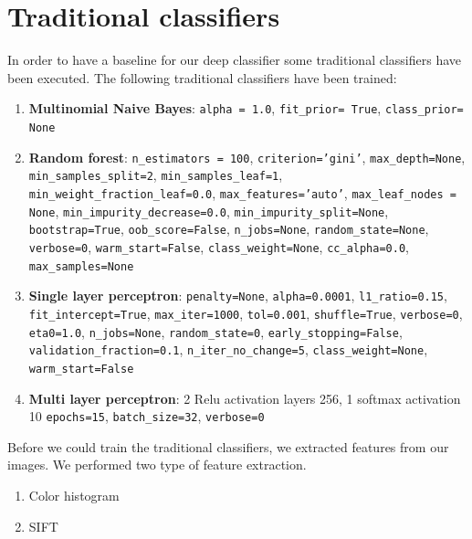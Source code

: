 \documentclass[11pt]{article}
\begin{document}
\section{Traditional classifiers}

In order to have a baseline for our deep classifier some traditional classifiers have been executed. The following traditional classifiers have been trained:

\begin{enumerate}
\item{%
\textbf{Multinomial Naive Bayes}: 
\texttt{alpha = 1.0}, \texttt{fit\_prior= True}, \texttt{class\_prior= None}
}
\item{%
\textbf{Random forest}: 
\texttt{n\_estimators = 100}, \texttt{criterion='gini'}, \texttt{max\_depth=None}, \texttt{min\_samples\_split=2}, \texttt{min\_samples\_leaf=1}, \texttt{min\_weight\_fraction\_leaf=0.0}, \texttt{max\_features='auto'}, \texttt{max\_leaf\_nodes = None}, \texttt{min\_impurity\_decrease=0.0}, \texttt{min\_impurity\_split=None}, \texttt{bootstrap=True}, \texttt{oob\_score=False}, \texttt{n\_jobs=None}, \texttt{random\_state=None}, \texttt{verbose=0}, \texttt{warm\_start=False}, \texttt{class\_weight=None}, \texttt{cc\_alpha=0.0}, \texttt{max\_samples=None}
}
\item{%
\textbf{Single layer perceptron}:  
\texttt{penalty=None}, \texttt{alpha=0.0001}, \texttt{l1\_ratio=0.15}, \texttt{fit\_intercept=True}, \texttt{max\_iter=1000}, \texttt{tol=0.001}, \texttt{shuffle=True}, \texttt{verbose=0}, \texttt{eta0=1.0}, \texttt{n\_jobs=None}, \texttt{random\_state=0}, \texttt{early\_stopping=False}, \texttt{validation\_fraction=0.1}, \texttt{n\_iter\_no\_change=5}, \texttt{class\_weight=None}, \texttt{warm\_start=False}
}
\item{%
\textbf{Multi layer perceptron}: 
2 Relu activation layers 256, 1 softmax activation 10  \texttt{epochs=15}, \texttt{batch\_size=32}, \texttt{verbose=0}
}
\end{enumerate}

Before we could train the traditional classifiers, we extracted features from our images. We performed two type of feature extraction. 

\begin{enumerate}
\item{Color histogram}
\item{SIFT}
\end{enumerate}
\end{document}
